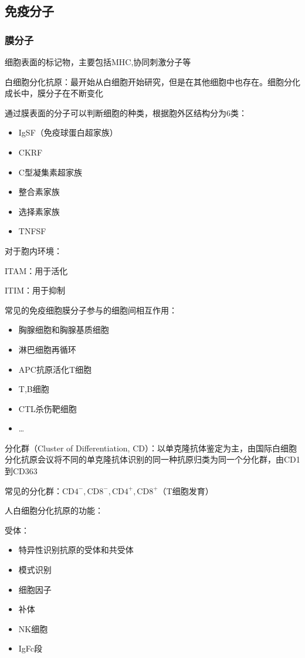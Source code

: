 \subsection{免疫分子}%
\label{sub:免疫分子}
\subsubsection*{膜分子}%
\label{subsub:膜分子}
细胞表面的标记物，主要包括MHC,协同刺激分子等
\begin{notation}
    白细胞分化抗原：最开始从白细胞开始研究，但是在其他细胞中也存在。细胞分化成长中，膜分子在不断变化
\end{notation}
通过膜表面的分子可以判断细胞的种类，根据胞外区结构分为6类：
\begin{itemize}
    \item IgSF（免疫球蛋白超家族）
    \item CKRF
    \item C型凝集素超家族
    \item 整合素家族
    \item 选择素家族
    \item TNFSF
    
\end{itemize}
\begin{notation}
    对于胞内环境：

    ITAM：用于活化
    
    ITIM：用于抑制
\end{notation}
常见的免疫细胞膜分子参与的细胞间相互作用：
\begin{itemize}
    \item 胸腺细胞和胸腺基质细胞
    \item 淋巴细胞再循环
    \item APC抗原活化T细胞
    \item T,B细胞
    \item CTL杀伤靶细胞
    \item \ldots 
    
\end{itemize}
\begin{notation}
    分化群（Cluster of Differentiation, CD）：以单克隆抗体鉴定为主，由国际白细胞分化抗原会议将不同的单克隆抗体识别的同一种抗原归类为同一个分化群，由CD1到CD363
\end{notation}
常见的分化群：$\text{CD4}^{-}, \text{CD8}^{-}, \text{CD4}^{+}, \text{CD8}^{+}$（T细胞发育）

人白细胞分化抗原的功能：

受体：
\begin{itemize}
    \item 特异性识别抗原的受体和共受体
    \item 模式识别
    \item 细胞因子
    \item 补体
    \item NK细胞
    \item IgFc段
\end{itemize}

